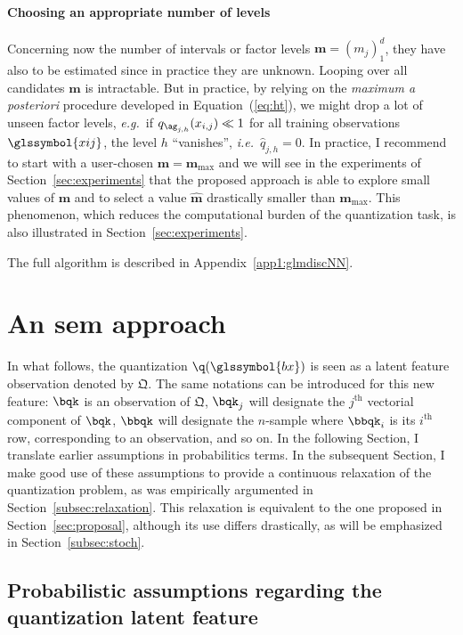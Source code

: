 \paragraph{Choosing an appropriate number of levels}

Concerning now the number of intervals or factor levels $\boldsymbol{m} = (m_j)_1^d$, they have also to be estimated since in practice they are unknown. Looping over all candidates $\boldsymbol{m}$ is intractable. But in practice, by relying on the \textit{maximum a posteriori} procedure developed in Equation~(\ref{eq:ht}), we might drop a lot of unseen factor levels, \textit{e.g.}\ if $q_{\ag_{j,h}}(x_{i,j}) \ll 1$ for all training observations $\glssymbol{xij}$, the level $h$ ``vanishes'', \textit{i.e.}\ $\hat{q}_{j,h} = 0$. In practice, I recommend to start with a user-chosen $\bm{m}=\boldsymbol{m}_{\max}$ and we will see in the experiments of Section~\ref{sec:experiments} that the proposed approach is able to explore small values of $\boldsymbol{m}$ and to select a value $\hat{\boldsymbol{m}}$ drastically smaller than $\boldsymbol{m}_{\max}$. This phenomenon, which reduces the computational burden of the quantization task, is also illustrated in Section~\ref{sec:experiments}.

The full algorithm is described in Appendix~\ref{app1:glmdiscNN}.


\section{An \gls{sem} approach} \label{sec:sem}
 
 
In what follows, the quantization $\q(\glssymbol{bx})$ is seen as a latent feature observation denoted by $\bm{\mathfrak{Q}}$. The same notations can be introduced for this new feature:  $\bqk$ is an observation of $\bm{\mathfrak{Q}}$, $\bqk_j$ will designate the $j^{\text{th}}$ vectorial component of $\bqk$, $\bbqk$ will designate the $n$-sample where $\bbqk_i$ is its $i^{\text{th}}$ row, corresponding to an observation, and so on. In the following Section, I translate earlier assumptions in probabilitics terms. In the subsequent Section, I make good use of these assumptions to provide a continuous relaxation of the quantization problem, as was empirically argumented in Section~\ref{subsec:relaxation}. This relaxation is equivalent to the one proposed in Section~\ref{sec:proposal}, although its use differs drastically, as will be emphasized in Section~\ref{subsec:stoch}.

\subsection{Probabilistic assumptions regarding the quantization latent feature}

